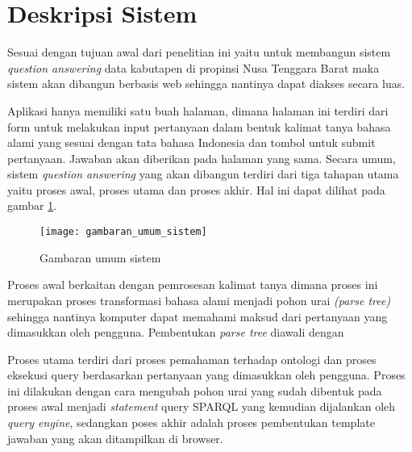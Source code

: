 \section{Deskripsi Sistem}
Sesuai dengan tujuan awal dari penelitian ini yaitu untuk membangun sistem \emph{question answering} data kabutapen di propinsi Nusa Tenggara Barat maka sistem akan dibangun berbasis web sehingga nantinya dapat diakses secara luas.

Aplikasi hanya memiliki satu buah halaman, dimana halaman ini terdiri dari form untuk melakukan input pertanyaan dalam bentuk kalimat tanya bahasa alami yang sesuai dengan tata bahasa Indonesia dan tombol untuk submit pertanyaan. Jawaban akan diberikan pada halaman yang sama. Secara umum, sistem \emph{question answering} yang akan dibangun terdiri dari tiga tahapan utama yaitu proses awal, proses utama dan proses akhir. Hal ini dapat dilihat pada gambar \ref{fig:gambaran_umum_sistem}.

\begin{figure}[th]
	\centering
	\texttt{[image: gambaran\_umum\_sistem]}
	\caption{Gambaran umum sistem}
	\label{fig:gambaran_umum_sistem}
\end{figure}

Proses awal berkaitan dengan pemrosesan kalimat tanya dimana proses ini merupakan proses transformasi bahasa alami menjadi pohon urai \emph{(parse tree)} sehingga nantinya komputer dapat memahami maksud dari pertanyaan yang dimasukkan oleh pengguna. Pembentukan \emph{parse tree} diawali dengan

Proses utama terdiri dari proses pemahaman terhadap ontologi dan proses eksekusi query berdasarkan pertanyaan yang dimasukkan oleh pengguna. Proses ini dilakukan dengan cara mengubah pohon urai yang sudah dibentuk pada proses awal menjadi \emph{statement} query SPARQL yang kemudian dijalankan oleh \emph{query engine}, sedangkan poses akhir adalah proses pembentukan template jawaban yang akan ditampilkan di browser.
